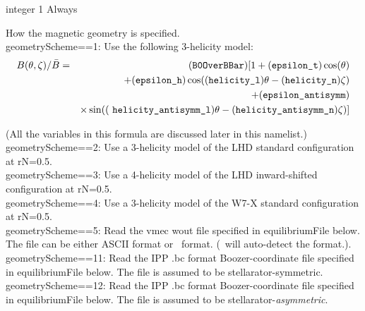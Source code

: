 \myhrule

{integer}
{1}
{Always}
{How the magnetic geometry is specified.\\

{\ttfamily geometryScheme}==1: Use the following 3-helicity model:\\
\begin{eqnarray}
\label{eq:Bmodel}
B(\theta,\zeta)/\bar{B} 
&=& (\mbox{\ttfamily B0OverBBar}) [1 + (\mbox{\ttfamily epsilon\_t}) \cos(\theta) \\
&& + (\mbox{\ttfamily epsilon\_h}) \cos((\mbox{\ttfamily helicity\_l}) \theta - (\mbox{\ttfamily helicity\_n}) \zeta) \nonumber \\
&&  + (\mbox{\ttfamily epsilon\_antisymm}) \nonumber \\
&& \times \sin((\mbox{ \ttfamily helicity\_antisymm\_l}) \theta - (\mbox{\ttfamily helicity\_antisymm\_n}) \zeta)] \nonumber
\end{eqnarray}

(All the variables in this formula are discussed later in this namelist.)\\

{\ttfamily geometryScheme}==2: Use a 3-helicity model of the LHD standard configuration at {\ttfamily rN}=0.5.\\

{\ttfamily geometryScheme}==3: Use a 4-helicity model of the LHD inward-shifted configuration at {\ttfamily rN}=0.5.\\

{\ttfamily geometryScheme}==4: Use a 3-helicity model of the W7-X standard configuration at {\ttfamily rN}=0.5.\\

{\ttfamily geometryScheme}==5: Read the {\ttfamily vmec wout} file specified in {\ttfamily equilibriumFile} below. The file can be
       either ASCII format or \netCDF~format. (\sfincs~will auto-detect the format.).\\

{\ttfamily geometryScheme}==11: Read the IPP {\ttfamily .bc} format Boozer-coordinate file specified in {\ttfamily equilibriumFile} below. 
The file is assumed to be stellarator-symmetric.\\

{\ttfamily geometryScheme}==12: Read the IPP {\ttfamily .bc} format Boozer-coordinate file specified in {\ttfamily equilibriumFile} below. 
The file is assumed to be stellarator-\emph{asymmetric}.
}

